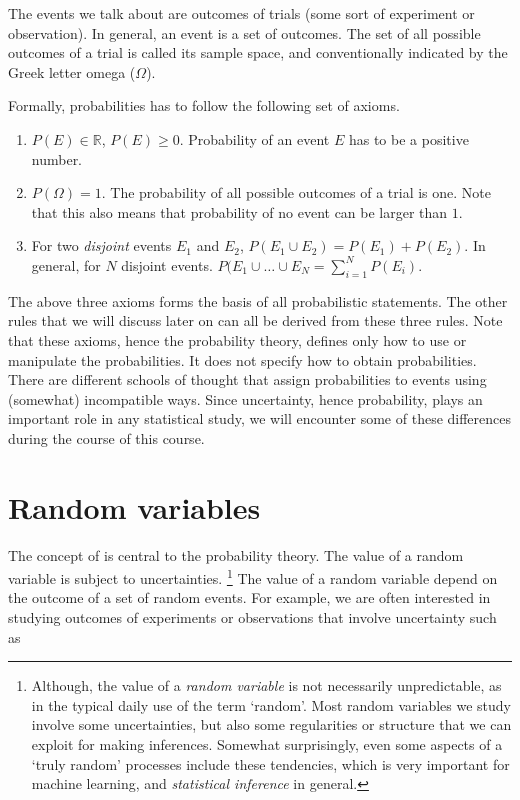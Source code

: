 The events we talk about are outcomes of trials
(some sort of experiment or observation).
In general, an event is a set of outcomes.
The set of all possible outcomes of a trial is called its sample space,
and conventionally indicated by the Greek letter omega ($\Omega$).

Formally, probabilities has to follow the following set of axioms.

\begin{enumerate}
  \item $P(E) \in \mathbb{R}$, $P(E) \ge 0$.
    Probability of an event $E$ has to be a positive number.
  \item $P(\Omega) = 1$.
    The probability of all possible outcomes of a trial is one.
    Note that this also means that 
    probability of no event can be larger than $1$.
  \item For two \emph{disjoint} events $E_{1}$ and $E_{2}$, 
    $P(E_{1}\cup{}E_{2}) = P(E_{1}) + P(E_{2})$.
    In general, for $N$ disjoint events.
    $P(E_{1}\cup\ldots\cup E_{N} = \sum_{i=1}^{N} P(E_{i})$.
\end{enumerate}

The above three axioms forms the basis of all probabilistic statements.
The other rules that we will discuss later on can all be derived from these three rules.
Note that these axioms,
hence the probability theory,
defines only how to use or manipulate the probabilities.
It does not specify how to obtain probabilities.
There are different schools of thought that assign probabilities to events
using (somewhat) incompatible ways.
Since uncertainty, hence probability,
plays an important role in any statistical study,
we will encounter some of these differences during the course of this course.

\section{Random variables}

The concept of  is central to the probability theory.
The value of a random variable is subject to uncertainties.%
\footnote{
  Although,
  the value of a \emph{random variable} is not necessarily unpredictable,
  as in the typical daily use of the term `random'.
  Most random variables we study involve some uncertainties,
  but also some regularities or structure that we can exploit
  for making inferences.
  Somewhat surprisingly,
  even some aspects of a `truly random' processes include these tendencies,
  which is very important for machine learning,
  and \emph{statistical inference} in general.
}
The value of a random variable depend on the outcome of a set of random events. 
For example, we are often interested in studying outcomes
of experiments or observations that involve uncertainty such as

